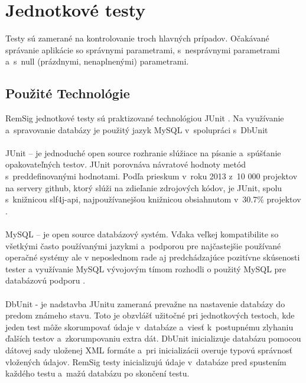 \documentclass[
  digital, %
  table,   %
oneside,
  nolof,     %
  nolot,     %
]{fithesis3}
\begin{document}
\section{Jednotkové testy}
Testy sú zamerané na kontrolovanie troch hlavných prípadov. Očakávané správanie aplikácie so správnymi parametrami, s~nesprávnymi parametrami a~s~null (prázdnymi, nenaplnenými) parametrami.
\subsection{Použité Technológie}
RemSig jednotkové testy sú praktizované technológiou  JUnit \cite{junit}. Na využívanie a~spravovanie databázy je použitý jazyk MySQL v~spolupráci s~DbUnit \cite{dbunit}\paragraph{}
JUnit – je jednoduché open source rozhranie slúžiace na písanie a~spúšťanie opakovateľných testov. JUnit porovnáva návratové hodnoty metód s~preddefinovanými hodnotami. Podľa prieskum v~roku 2013 z~10 000 projektov na servery github, ktorý slúži na zdieľanie zdrojových kódov, je JUnit, spolu s~knižnicou slf4j-api, najpoužívanejšou knižnicou obsiahnutom v~30.7\% projektov \cite{gitHubAnalysis}. \paragraph{}
MySQL – je open source databázový systém. Vďaka veľkej kompatibilite so všetkými často používanými jazykmi a~podporou pre najčastejšie používané operačné systémy ale v neposlednom rade aj predchádzajúce pozitívne skúsenosti tester a využívanie MySQL vývojovým tímom rozhodli o použitý MySQL pre databázovú podporu \cite{mySqlBible}.\paragraph{}
DbUnit -  je nadstavba JUnitu zameraná prevažne na nastavenie databázy do predom známeho stavu. Toto je obzvlášť užitočné pri jednotkových testoch, kde jeden test môže skorumpovať údaje v~databáze a~viesť k~postupnému zlyhaniu ďalších  testov a~zkorumpovaniu extra dát. DbUnit inicializuje databázu pomocou  dátovej sady uloženej XML formáte a~pri inicializácii overuje typovú správnosť vložených údajov. RemSig testy inicializujú údaje v~databáze pred  spustením  každého testu a~mažú databázu po skončení testu.  
\end{document}
